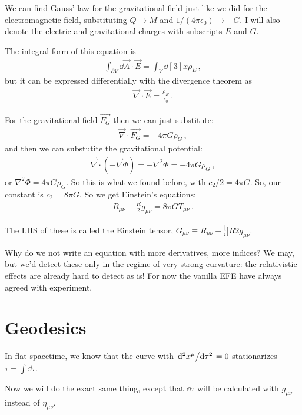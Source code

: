 \documentclass[main.tex]{subfiles}
\begin{document}
We can find Gauss' law for the gravitational field just like we did for the electromagnetic field, substituting \(Q \rightarrow M\) and \(1 / (4 \pi \epsilon_{0}) \rightarrow -G\).
I will also denote the electric and gravitational charges with subscripts \(E\) and \(G\).

The integral form of this equation is 
%
\begin{align}
  \int _{\partial V} \dd{\vec{A}} \cdot \vec{E} = \int_V \dd[3]{x} \rho_E
\,,
\end{align}
%
but it can be expressed differentially with the divergence theorem as 
%
\begin{align}
  \vec{\nabla} \cdot \vec{E} = \frac{\rho_E}{\epsilon_0 }
\,.
\end{align}

For the gravitational field \(\vec{F_G}\) then we can just substitute: 
%
\begin{align}
  \vec{\nabla} \cdot \vec{F_G} = - 4 \pi G \rho_G
\,,
\end{align}
%
and then we can substutite the gravitational potential: 
%
\begin{align}
  \vec{\nabla} \cdot ( - \vec{\nabla} \Phi ) = - \nabla^2 \Phi  = - 4 \pi G \rho_G
\,,
\end{align}
%
or \(\nabla^2 \Phi = 4 \pi G \rho_G\).
So this is what we found before, with \(c_2/2 = 4 \pi G \).
So, our constant is \(c_2 = 8 \pi G\). So we get Einstein's equations: 
%
\begin{align}
  R_{\mu \nu } - \frac{R}{2} g_{\mu \nu } = 8 \pi G T_{\mu \nu }
\,.
\end{align}

The LHS of these is called the Einstein tensor, \(G_{\mu \nu } \equiv R_{\mu \nu } - \frac[i]{R}{2} g_{\mu \nu }\).

Why do we not write an equation with more derivatives, more indices? We may, but we'd detect these only in the regime of very strong curvature: the relativistic effects are already hard to detect as is!
For now the vanilla EFE have always agreed with experiment.

\section{Geodesics}

In flat spacetime, we know that the curve with \(\dv*[2]{x^{\mu }}{\tau }=0\) stationarizes \(\tau = \int \dd{\tau }\).

Now we will do the exact same thing, except that \(\dd{\tau }\) will be calculated with \(g_{\mu \nu }\) instead of \(\eta_{\mu \nu } \).
\end{document}
